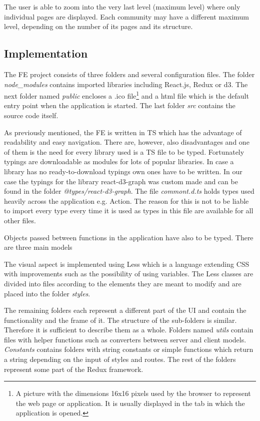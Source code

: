 The user is able to zoom into the very last level (maximum level) where only individual pages are displayed. Each community may have a different maximum level, depending on the number of its pages and its structure.

\subsection{Implementation}
The FE project consists of three folders and several configuration files. The folder \textit{node\_modules} contains imported libraries including React.js, Redux or d3. The next folder named \textit{public} encloses a .ico file\footnote {A picture with the dimensions 16x16 pixels used by the browser to represent the web page or application. It is usually displayed in the tab in which the application is opened.} and a html file which is the default entry point when the application is started. The last folder \textit{src} contains the source code itself. 

As previously mentioned, the FE is written in TS which has the advantage of readability and easy navigation. There are, however, also disadvantages and one of them is the need for every library used is a TS file to be typed. Fortunately typings are downloadable as modules for lots of popular libraries. In case a library has no ready-to-download typings own ones have to be written. In our case the typings for the library react-d3-graph was custom made and can be found in the folder \textit{@types/react-d3-graph}. The file \textit{commont.d.ts} holds types used heavily across the application e.g. Action. The reason for this is not to be liable to import every type every time it is used as types in this file are available for all other files. 

Objects passed between functions in the application have also to be typed. There are three main models

The visual aspect is implemented using Less \cite{less} which is a language extending CSS with improvements such as the possibility of using variables. The Less classes are divided into files according to the elements they are meant to modify and are placed into the folder \textit{styles}. 

The remaining folders each represent a different part of the UI and contain the functionality and the frame of it. The structure of the sub-folders is similar. Therefore it is sufficient to describe them as a whole. Folders named \textit{utils} contain files with helper functions such as converters between server and client models. \textit{Constants} contains folders with string constants or simple functions which return a string depending on the input  of styles and routes. The rest of the folders represent some part of the Redux framework. 

